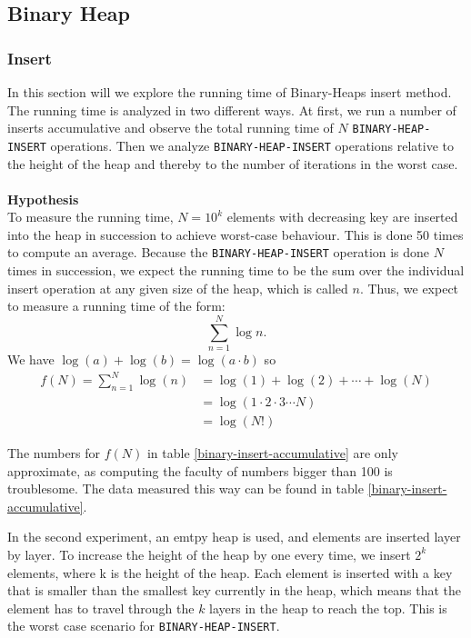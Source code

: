 \documentclass[a4paper,10pt]{article}
\begin{document}
\subsection{Binary Heap}
\subsubsection{Insert}
In this section will we explore the running time of Binary-Heaps insert method. The running time is analyzed in two different ways. At first, we run a number of inserts accumulative and observe the total running time of $N$ \texttt{BINARY-HEAP-INSERT} operations. Then we analyze \texttt{BINARY-HEAP-INSERT} operations relative to the height of the heap and thereby to the number of iterations in the worst case.\\\\
{\bf Hypothesis}\\
To measure the running time, $N=10^k$ elements with decreasing key are inserted into the heap in succession to achieve worst-case behaviour. This is done 50 times to compute an average. Because the \texttt{BINARY-HEAP-INSERT} operation is done $N$ times in succession, we expect the running time to be the sum over the individual insert operation at any given size of the heap, which is called $n$.
Thus, we expect to measure a running time of the form: \[\sum^N_{n=1}\log n.\]
We have $\log(a)+\log(b)=\log(a\cdot b)$ so 
\begin{align*}
  f(N)=\sum^N_{n=1}\log(n)&=\log(1)+\log(2)+\cdots+\log(N)\\
  &=\log(1\cdot2\cdot3\cdots N)\\
  &=\log(N!)
\end{align*}

The numbers for $f(N)$ in table \ref{binary-insert-accumulative} are only approximate, as computing the faculty of numbers bigger than 100 is troublesome. The data measured this way can be found in table \ref{binary-insert-accumulative}.

In the second experiment, an emtpy heap is used, and elements are inserted layer by layer. To increase the height of the heap by one every time, we insert $2^k$ elements, where k is the height of the heap. Each element is inserted with a key that is smaller than the smallest key currently in the heap, which means that the element has to travel through the $k$ layers in the heap to reach the top. This is the worst case scenario for \texttt{BINARY-HEAP-INSERT}.
\end{document}
